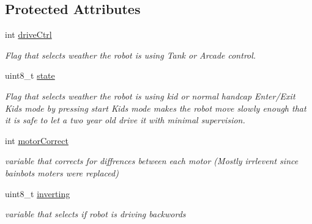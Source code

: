 \subsection*{Protected Attributes}
\begin{DoxyCompactItemize}
\item 
\mbox{\label{class_basic_drive_controller_a5ad8d9c49caf2e2e373e4ba61502e3a3}} 
int \mbox{\hyperlink{class_basic_drive_controller_a5ad8d9c49caf2e2e373e4ba61502e3a3}{drive\+Ctrl}}
\begin{DoxyCompactList}\small\item\em Flag that selects weather the robot is using Tank or Arcade control. \end{DoxyCompactList}\item 
\mbox{\label{class_basic_drive_controller_af07886b0094095fdbc490df4d06b0e33}} 
uint8\+\_\+t \mbox{\hyperlink{class_basic_drive_controller_af07886b0094095fdbc490df4d06b0e33}{state}}
\begin{DoxyCompactList}\small\item\em Flag that selects weather the robot is using kid or normal handcap Enter/\+Exit Kids mode by pressing start Kids mode makes the robot move slowly enough that it is safe to let a two year old drive it with minimal supervision. \end{DoxyCompactList}\item 
\mbox{\label{class_basic_drive_controller_a5ea443561f5c7f79d86264a8fa9f107f}} 
int \mbox{\hyperlink{class_basic_drive_controller_a5ea443561f5c7f79d86264a8fa9f107f}{motor\+Correct}}
\begin{DoxyCompactList}\small\item\em variable that corrects for diffrences between each motor (Mostly irrlevent since bainbots moters were replaced) \end{DoxyCompactList}\item 
\mbox{\label{class_basic_drive_controller_ae7b248880cef70b4e97037d9c0dcc00c}} 
uint8\+\_\+t \mbox{\hyperlink{class_basic_drive_controller_ae7b248880cef70b4e97037d9c0dcc00c}{inverting}}
\begin{DoxyCompactList}\small\item\em variable that selects if robot is driving backwords \end{DoxyCompactList}\item 

\end{DoxyCompactItemize}
